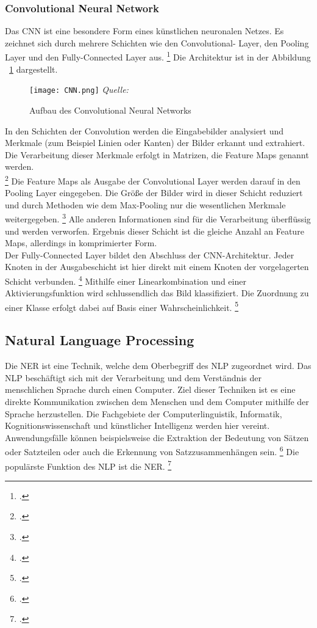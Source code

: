 \subsubsection{Convolutional Neural Network}
Das \ac{CNN} ist eine besondere Form eines künstlichen neuronalen Netzes. Es zeichnet sich durch mehrere Schichten wie den Convolutional- Layer, den Pooling Layer und den Fully-Connected Layer aus. \footcite[\vglf][]{internationalconferenceonadvancesinelectronics2018}
Die Architektur ist in der Abbildung ~\ref{fig:CNN} dargestellt.
\\

\begin{figure}[H]
    \caption{Aufbau des Convolutional Neural Networks}\label{fig:CNN}
    \texttt{[image: CNN.png]}
    \textit{Quelle:~\cite[][]{alzubaidiReviewDeepLearning2021}}
\end{figure}

In den Schichten der Convolution werden die Eingabebilder analysiert und Merkmale (zum Beispiel Linien oder Kanten) der Bilder erkannt und extrahiert.
Die Verarbeitung dieser Merkmale erfolgt in Matrizen, die Feature Maps genannt werden. \\ \footcite[\vglf][ \& 328]{Goodfellow-2016}
Die Feature Maps als Ausgabe der Convolutional Layer werden darauf in den Pooling Layer eingegeben.
Die Größe der Bilder wird in dieser Schicht reduziert und durch Methoden wie dem Max-Pooling nur die wesentlichen Merkmale weitergegeben.  \footcite[\vglf][-339]{Goodfellow-2016}
Alle anderen Informationen sind für die Verarbeitung überflüssig und werden verworfen. Ergebnis dieser Schicht ist die gleiche Anzahl an Feature Maps, allerdings in komprimierter Form. \\
Der Fully-Connected Layer bildet den Abschluss der \ac{CNN}-Architektur. Jeder Knoten in der Ausgabeschicht ist hier direkt mit einem Knoten der vorgelagerten Schicht verbunden. \footcite[\vglf][]{aggarwal2021}
Mithilfe einer Linearkombination und einer Aktivierungsfunktion wird schlussendlich das Bild klassifiziert. Die Zuordnung zu einer Klasse erfolgt dabei auf Basis einer Wahrscheinlichkeit. \footcite[\vglf][]{tang2022}

\subsection{Natural Language Processing}
Die \acl{NER} ist eine Technik, welche dem Oberbegriff des \acl{NLP} zugeordnet wird. Das \ac{NLP} beschäftigt sich mit der Verarbeitung und dem Verständnis der menschlichen Sprache durch einen Computer.
Ziel dieser Techniken ist es eine direkte Kommunikation zwischen dem Menschen und dem Computer mithilfe der Sprache herzustellen. Die Fachgebiete der Computerlinguistik, Informatik, Kognitionswissenschaft und künstlicher Intelligenz werden hier vereint.
Anwendungsfälle können beispielsweise die Extraktion der Bedeutung von Sätzen oder Satzteilen oder auch die Erkennung von Satzzusammenhängen sein. \footcite[\vglf][ \& 2]{deng2018} Die populärste Funktion des \ac{NLP} ist die \acf{NER}. \footcite[\vglf][]{strobl2022}

